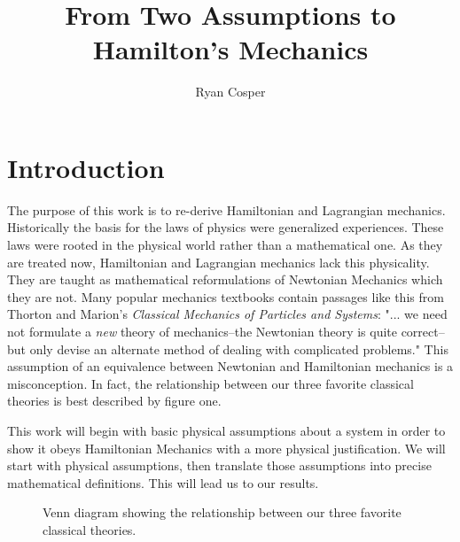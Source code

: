 \documentclass{article}
\title{From Two Assumptions to Hamilton's Mechanics}
\author{Ryan Cosper}
\begin{document}
\maketitle

\section{Introduction}

	The purpose of this work is to re-derive Hamiltonian and Lagrangian mechanics. Historically the basis for the laws of physics were generalized experiences. These laws were rooted in the physical world rather than a mathematical one. As they are treated now, Hamiltonian and Lagrangian mechanics lack this physicality. They are taught as mathematical reformulations of Newtonian Mechanics which they are not. Many popular mechanics textbooks contain passages like this from Thorton and Marion's \textit{Classical Mechanics of Particles and Systems}: "... we need not formulate a \textit{new} theory of mechanics--the Newtonian theory is quite correct--but only devise an alternate method of dealing with complicated problems\cite{thornton_marion_2014}." This assumption of an equivalence between Newtonian and Hamiltonian mechanics is a misconception. In fact, the relationship between our three favorite classical theories is best described by figure one.
	
	 This work will begin with basic physical assumptions about a system in order to show it obeys Hamiltonian Mechanics with a more physical justification. We will start with physical assumptions, then translate those assumptions into precise mathematical definitions. This will lead us to our results. 	
	 
\begin{figure}[!!ht]
\begin{center}
\end{center}
\caption{Venn diagram showing the relationship between our three favorite classical theories.}
\end{figure}
\end{document}
